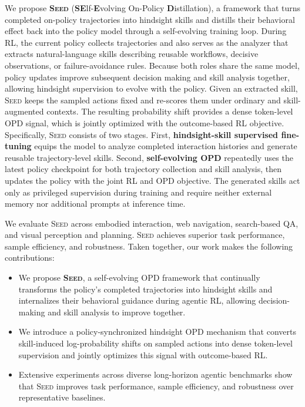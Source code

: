 We propose \textbf{\textsc{Seed}} (\textbf{SE}lf-\textbf{E}volving On-Policy \textbf{D}istillation), a framework that turns completed on-policy trajectories into hindsight skills and distills their behavioral effect back into the policy model through a self-evolving training loop. During RL, the current policy collects trajectories and also serves as the analyzer that extracts natural-language skills describing reusable workflows, decisive observations, or failure-avoidance rules. Because both roles share the same model, policy updates improve subsequent decision making and skill analysis together, allowing hindsight supervision to evolve with the policy. Given an extracted skill, \textsc{Seed} keeps the sampled actions fixed and re-scores them under ordinary and skill-augmented contexts. The resulting probability shift provides a dense token-level OPD signal, which is jointly optimized with the outcome-based RL objective. Specifically, \textsc{Seed} consists of two stages. First, \textbf{hindsight-skill supervised fine-tuning} equips the model to analyze completed interaction histories and generate reusable trajectory-level skills. Second, \textbf{self-evolving OPD} repeatedly uses the latest policy checkpoint for both trajectory collection and skill analysis, then updates the policy with the joint RL and OPD objective. The generated skills act only as privileged supervision during training and require neither external memory nor additional prompts at inference time.

We evaluate \textsc{Seed} across embodied interaction, web navigation, search-based QA, and visual perception and planning. \textsc{Seed} achieves superior task performance, sample efficiency, and robustness. Taken together, our work makes the following contributions:
\begin{itemize}[leftmargin=1.5em]
    \item We propose \textbf{\textsc{Seed}}, a self-evolving OPD framework that continually transforms the policy's completed trajectories into hindsight skills and internalizes their behavioral guidance during agentic RL, allowing decision-making and skill analysis to improve together.

    \item We introduce a policy-synchronized hindsight OPD mechanism that converts skill-induced log-probability shifts on sampled actions into dense token-level supervision and jointly optimizes this signal with outcome-based RL.
    
    \item Extensive experiments across diverse long-horizon agentic benchmarks show that \textsc{Seed} improves task performance, sample efficiency, and robustness over representative baselines.
\end{itemize}